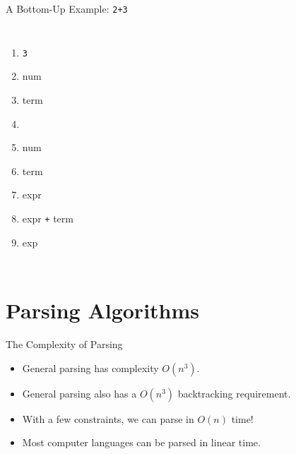 \documentclass[handout]{beamer}
\newenvironment{scaled}{%
 \begin{adjustbox}{max width=\textwidth, max height=0.7\textheight}
 }{
 \end{adjustbox}
}
\begin{document}
\begin{frame}{A Bottom-Up Example: \texttt{2+3}} 
    \begin{columns}
    \begin{enumerate}[<+->]
        \item \texttt{3}
        \item num
        \item term 
        \item {}
        \item num
        \item term
        \item expr
        \item expr \texttt{+} term
        \item exp
    \end{enumerate}
    \begin{center}
        \begin{scaled}
        \end{scaled}
    \end{center}
    \end{columns}
\end{frame}


\section{Parsing Algorithms}
\begin{frame}{The Complexity of Parsing}
    \begin{itemize}
        \item General parsing has complexity $O(n^3)$.
        \item General parsing also has a $O(n^3)$ backtracking requirement.
        \item With a few constraints, we can parse in $O(n)$ time!
        \item Most computer languages can be parsed in linear time.
    \end{itemize}
\end{frame}
\end{document}
